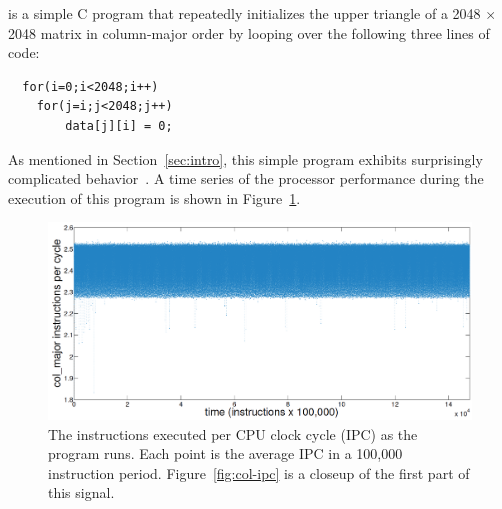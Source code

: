 


\col is a simple C program that repeatedly initializes the upper
triangle of a 2048 $\times$ 2048 matrix in column-major order by
looping over the following three lines of code:
\begin{lstlisting}
  for(i=0;i<2048;i++)
  	for(j=i;j<2048;j++)
  		data[j][i] = 0;
\end{lstlisting}
% 
%   
%
\noindent As mentioned in Section~\ref{sec:intro}, this simple program
exhibits surprisingly complicated behavior~\cite{mytkowicz09}.  A time
series of the processor performance during the execution of this
program is shown in Figure~\ref{fig:col-ts}.
\begin{figure}[htbp]
  \centering
    \includegraphics[width=\columnwidth]{figs/colFullTS}
    \caption{The instructions executed per CPU clock cycle (IPC) as
      the \col program runs.  Each point is the average IPC in a
      100,000 instruction period. Figure~\ref{fig:col-ipc} is a
      closeup of the first part of this signal.  }
    \label{fig:col-ts}
  
  \end{figure}

